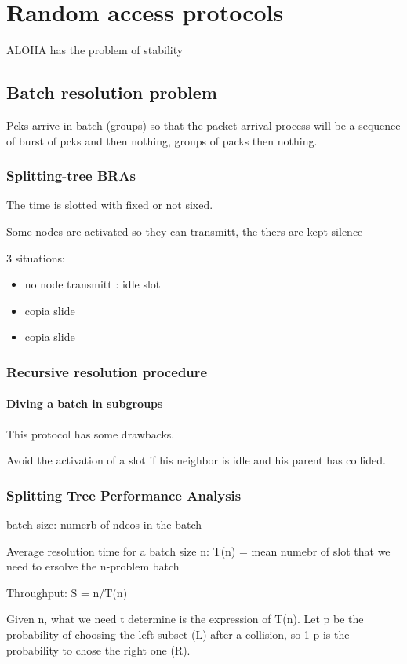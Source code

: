\section{Random access protocols}

ALOHA has the problem of stability

\subsection{Batch resolution problem}
Pcks arrive in batch (groups) so that the packet arrival process will be a sequence of burst of pcks and then nothing, groups of packs then nothing.

\subsubsection{Splitting-tree BRAs}
The time is slotted with fixed or not sixed.

Some nodes are activated  so they can transmitt, the thers are kept silence

3 situations:
\begin{itemize}
\item no node transmitt : idle slot
\item copia slide
\item copia slide
\end{itemize}

\subsubsection{Recursive resolution procedure}
\paragraph{Diving a batch in subgroups}
This protocol has some drawbacks. 

Avoid the activation of a slot if his neighbor is idle and his parent has collided.

\subsubsection{Splitting Tree Performance Analysis}
batch size: numerb of ndeos in the batch

Average resolution time for a batch size n: T(n) = mean numebr of slot that we need to ersolve the n-problem batch

Throughput: S = n/T(n)

Given n, what we need t determine is the expression of T(n).
Let p be the probability of choosing the left subset (L) after a collision, so 1-p is the probability to chose the right one (R).

